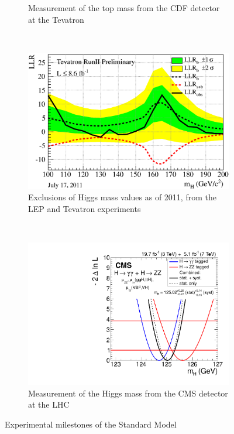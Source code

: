\begin{figure}
\begin{subfigure}[h]{0.45\textwidth}
     \caption{Measurement of the top mass from the CDF detector at the
       Tevatron \cite{ex:CDF_Top_Mass_image}} \label{fig:topMass_CDF}
   \end{subfigure}
   ~ %
   \begin{subfigure}[h]{0.45\textwidth}
     \includegraphics[width=\textwidth]{Figures/Experimental_Results/tevComboLLR_July27.eps}
     \caption{Exclusions of Higgs mass values as of 2011, from the LEP
    and Tevatron experiments \cite{CDFandD0:2011aa}} \label{fig:Higgs_exclusion}
   \end{subfigure}
   ~ %
   \begin{subfigure}[h]{0.45\textwidth}
     \includegraphics[width=\textwidth]{Figures/Experimental_Results/CMS_higgsMass_scan_1d_all.pdf}
     \caption{Measurement of the Higgs mass from the CMS detector at
       the LHC \cite{ex:CMS_Higgs_Mass_image}} \label{fig:higgsMass_CMS}
   \end{subfigure}
   \caption{Experimental milestones of the Standard Model}\label{fig:ex_milestones_sm}
\end{figure}

